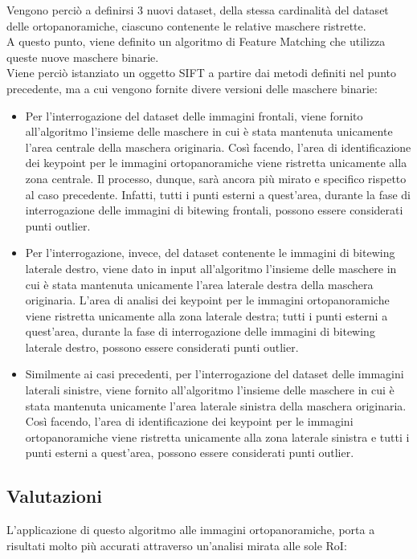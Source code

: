 \documentclass[12pt,a4paper,openright,twoside]{book}
\begin{document}
Vengono perciò a definirsi 3 nuovi dataset, della stessa cardinalità del dataset delle ortopanoramiche, ciascuno contenente le relative maschere ristrette.\\
A questo punto, viene definito un algoritmo di Feature Matching che utilizza queste nuove maschere binarie.\\

Viene perciò istanziato un oggetto SIFT a partire dai metodi definiti nel punto precedente, ma a cui vengono fornite divere versioni delle maschere binarie:
\begin{itemize}
\item Per l'interrogazione del dataset delle immagini frontali, viene fornito all'algoritmo l'insieme delle maschere in cui è stata mantenuta unicamente l'area centrale della maschera originaria. Così facendo, l'area di identificazione dei keypoint per le immagini ortopanoramiche viene ristretta unicamente alla zona centrale. Il processo, dunque, sarà ancora più mirato e specifico rispetto al caso precedente. Infatti, tutti i punti esterni a quest'area, durante la fase di interrogazione delle immagini di bitewing frontali, possono essere considerati punti outlier.
\item  Per l'interrogazione, invece, del dataset contenente le immagini di bitewing laterale destro, viene dato in input all'algoritmo l'insieme delle maschere in cui è stata mantenuta unicamente l'area laterale destra della maschera originaria. L'area di analisi dei keypoint per le immagini ortopanoramiche viene ristretta unicamente alla zona laterale destra; tutti i punti esterni a quest'area, durante la fase di interrogazione delle immagini di bitewing laterale destro, possono essere considerati punti outlier.
\item Similmente ai casi precedenti, per l'interrogazione del dataset delle immagini laterali sinistre, viene fornito all'algoritmo l'insieme delle maschere in cui è stata mantenuta unicamente l'area laterale sinistra della maschera originaria. Così facendo, l'area di identificazione dei keypoint per le immagini ortopanoramiche viene ristretta unicamente alla zona laterale sinistra e tutti i punti esterni a quest'area, possono essere considerati punti outlier.
\end{itemize}

\subsection{Valutazioni}
L'applicazione di questo algoritmo alle immagini ortopanoramiche, porta a risultati molto più accurati attraverso un'analisi mirata alle sole RoI:
\end{document}
